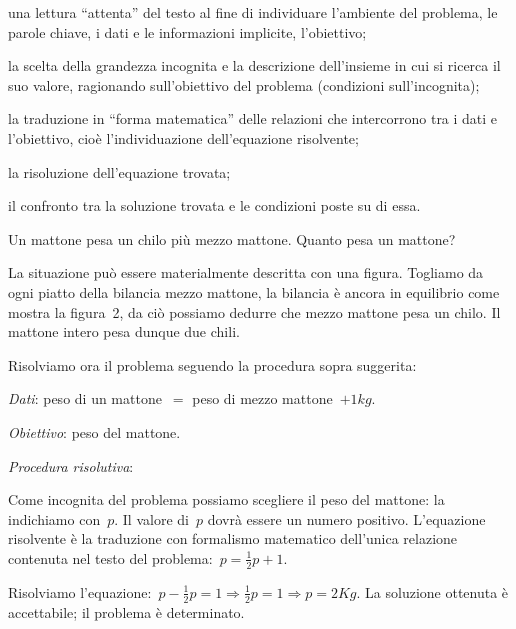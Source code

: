 \begin{enumeratea}
\item una lettura ``attenta'' del
testo al fine di individuare l'ambiente del problema,
le parole chiave, i dati e le informazioni implicite,
l'obiettivo;
\item la scelta della grandezza incognita e la descrizione
dell'insieme in cui si ricerca il suo valore,
ragionando sull'obiettivo del problema (condizioni sull'incognita);
\item la traduzione in ``forma matematica'' delle relazioni che intercorrono 
tra i dati e l'obiettivo, cioè l'individuazione dell'equazione risolvente;
\item la risoluzione dell'equazione trovata;
\item il confronto tra la soluzione trovata e le condizioni poste su di essa.
\end{enumeratea}

\begin{problema}
 Un mattone pesa un chilo più mezzo mattone. Quanto pesa un mattone?
\end{problema}

\begin{soluzione}
 La situazione può essere materialmente descritta con una figura.
Togliamo da ogni piatto della bilancia mezzo mattone, la bilancia è
ancora in equilibrio come mostra la figura~2, da ciò possiamo
dedurre che mezzo mattone pesa un chilo. Il mattone intero pesa dunque
due chili.
\begin{center}
 
\end{center}

Risolviamo ora il problema seguendo la procedura sopra suggerita:

\emph{Dati}: peso di un mattone~\(=\) peso di mezzo mattone~\(+ 1\unit{kg}.\)

\emph{Obiettivo}: peso del mattone.

\emph{Procedura risolutiva}:

Come incognita del problema possiamo scegliere il peso del mattone: la
indichiamo con~\(p\).
Il valore di~\(p\) dovrà essere un numero positivo.
L'equazione risolvente è la traduzione con formalismo
matematico dell'unica relazione contenuta nel testo del
problema:~\(p=\frac{1}{2}p+1\).

Risolviamo l'equazione:~\(p-\frac{1}{2}p=1\Rightarrow\frac{1}{2}p=1\Rightarrow 
p=2\unit{Kg}.\)
La soluzione ottenuta è accettabile; il problema è determinato.
\end{soluzione}

